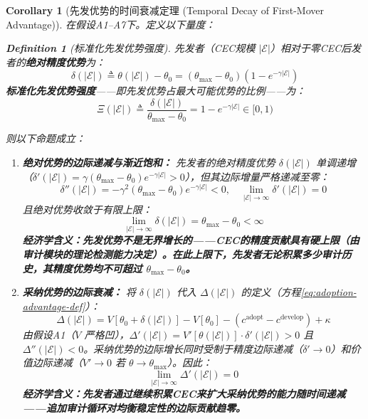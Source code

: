 \documentclass[12pt,a4paper]{ctexart}
\newtheorem{corollary}[theorem]{Corollary}
\theoremstyle{definition}
\newtheorem{definition}{Definition}[section]
\theoremstyle{remark}
\begin{document}
\begin{corollary}[先发优势的时间衰减定理 (Temporal Decay of First-Mover Advantage)]
\label{cor:first-mover-decay}
在假设A1--A7下。定义以下量度：

\begin{definition}[标准化先发优势强度]
先发者（CEC规模 $|\mathcal{E}|$）相对于零CEC后发者的\textbf{绝对精度优势}为：
\begin{equation}
\delta(|\mathcal{E}|) \triangleq \theta(|\mathcal{E}|) - \theta_0 = (\theta_{\max} - \theta_0)(1 - e^{-\gamma |\mathcal{E}|})
\end{equation}
\textbf{标准化先发优势强度}——即先发优势占最大可能优势的比例——为：
\begin{equation}
\Xi(|\mathcal{E}|) \triangleq \frac{\delta(|\mathcal{E}|)}{\theta_{\max} - \theta_0} = 1 - e^{-\gamma |\mathcal{E}|} \in [0, 1)
\end{equation}
\end{definition}

则以下命题成立：

\begin{enumerate}[label=(\roman*), itemsep=6pt]
\item \textbf{绝对优势的边际递减与渐近饱和：} 先发者的绝对精度优势 $\delta(|\mathcal{E}|)$ 单调递增（$\delta'(|\mathcal{E}|) = \gamma(\theta_{\max} - \theta_0)e^{-\gamma |\mathcal{E}|} > 0$），但其\textit{边际增量}严格递减至零：
\begin{equation}
\delta''(|\mathcal{E}|) = -\gamma^2 (\theta_{\max} - \theta_0) e^{-\gamma |\mathcal{E}|} < 0, \quad \lim_{|\mathcal{E}| \to \infty} \delta'(|\mathcal{E}|) = 0
\end{equation}
且绝对优势收敛于有限上限：
\begin{equation}
\lim_{|\mathcal{E}| \to \infty} \delta(|\mathcal{E}|) = \theta_{\max} - \theta_0 < \infty
\end{equation}
\textbf{经济学含义：先发优势不是无界增长的——CEC的精度贡献具有硬上限（由审计模块的理论检测能力决定）。在此上限下，先发者无论积累多少审计历史，其精度优势均不可超过 $\theta_{\max} - \theta_0$。}

\item \textbf{采纳优势的边际衰减：} 将 $\delta(|\mathcal{E}|)$ 代入 $\Delta(|\mathcal{E}|)$ 的定义（方程\ref{eq:adoption-advantage-def}）：
\begin{equation}
\Delta(|\mathcal{E}|) = V[\theta_0 + \delta(|\mathcal{E}|)] - V[\theta_0] - (c^{\text{adopt}} - c^{\text{develop}}) + \kappa
\end{equation}
由假设A1（$V$ 严格凹），$\Delta'(|\mathcal{E}|) = V'[\theta(|\mathcal{E}|)] \cdot \delta'(|\mathcal{E}|) > 0$ 且 $\Delta''(|\mathcal{E}|) < 0$。采纳优势的边际增长同时受制于精度边际递减（$\delta' \to 0$）和价值边际递减（$V' \to 0$ 若 $\theta \to \theta_{\max}$）。因此：
\begin{equation}
\lim_{|\mathcal{E}| \to \infty} \Delta'(|\mathcal{E}|) = 0
\end{equation}
\textbf{经济学含义：先发者通过继续积累CEC来扩大采纳优势的能力随时间递减——追加审计循环对均衡稳定性的边际贡献趋零。}


\end{enumerate}
\end{corollary}
\end{document}
